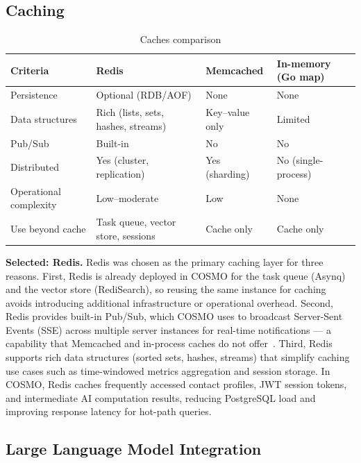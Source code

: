 \documentclass[a4paper]{article}
\begin{document}
\subsection{Caching}

\begin{table}[H]
\centering
\caption{Caches comparison}
\label{tab:cache-comparison}
\begin{tabular}{l p{4cm} p{4cm} p{4cm}}
\hline
\textbf{Criteria} & \textbf{Redis} & \textbf{Memcached} & \textbf{In-memory (Go map)} \\
\hline
Persistence & Optional (RDB/AOF) & None & None \\
Data structures & Rich (lists, sets, hashes, streams) & Key--value only & Limited \\
Pub/Sub & Built-in & No & No \\
Distributed & Yes (cluster, replication) & Yes (sharding) & No (single-process) \\
Operational complexity & Low--moderate & Low & None \\
Use beyond cache & Task queue, vector store, sessions & Cache only & Cache only \\
\hline
\end{tabular}
\end{table}

\textbf{Selected: Redis.}
Redis was chosen as the primary caching layer for three reasons.
First, Redis is already deployed in COSMO for the task queue
(Asynq) and the vector store (RediSearch), so reusing the same
instance for caching avoids introducing additional infrastructure
or operational overhead. Second, Redis provides built-in Pub/Sub,
which COSMO uses to broadcast Server-Sent Events (SSE) across
multiple server instances for real-time notifications --- a
capability that Memcached and in-process caches do not
offer~\cite{redis_docs}. Third, Redis supports rich data
structures (sorted sets, hashes, streams) that simplify caching
use cases such as time-windowed metrics aggregation and session
storage. In COSMO, Redis caches frequently accessed contact
profiles, JWT session tokens, and intermediate AI computation
results, reducing PostgreSQL load and improving response latency
for hot-path queries.

\subsection{Large Language Model Integration}
\label{appendix:tech-llm}
\end{document}
